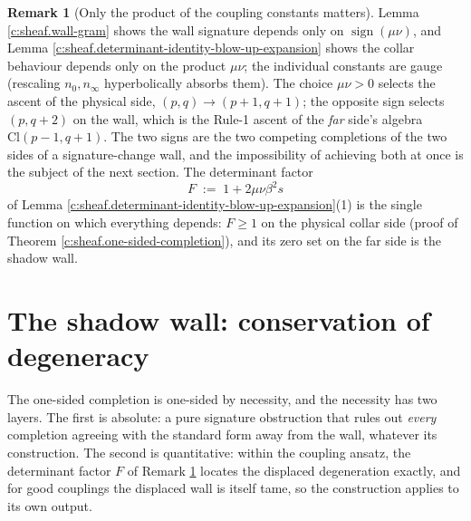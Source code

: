 \documentclass[11pt]{article}
\theoremstyle{definition}
\newtheorem{remark}[theorem]{Remark}
\theoremstyle{plain}
\providecommand{\Cl}{}\renewcommand{\Cl}{\mathrm{Cl}}
\providecommand{\nInf}{}\renewcommand{\nInf}{n_\infty}
\providecommand{\nO}{}\renewcommand{\nO}{n_0}
\begin{document}
\begin{remark}[Only the product of the coupling constants matters]\label{c:note.sheaf.only-product-coupling-constants-matters}
Lemma \ref{c:sheaf.wall-gram} shows the wall signature depends only on $\operatorname{sign}(\mu\nu)$, and Lemma \ref{c:sheaf.determinant-identity-blow-up-expansion} shows the collar behaviour depends only on the product $\mu\nu$; the individual constants are gauge (rescaling $\nO, \nInf$ hyperbolically absorbs them). The choice $\mu\nu > 0$ selects the ascent of the physical side, $(p,q) \to (p{+}1,q{+}1)$; the opposite sign selects $(p,q{+}2)$ on the wall, which is the Rule-1 ascent of the \emph{far} side's algebra $\Cl(p{-}1,q{+}1)$. The two signs are the two competing completions of the two sides of a signature-change wall, and the impossibility of achieving both at once is the subject of the next section. The determinant factor
\[
F \;:=\; 1 + 2\mu\nu\beta^2 s
\]
of Lemma \ref{c:sheaf.determinant-identity-blow-up-expansion}(1) is the single function on which everything depends: $F \geq 1$ on the physical collar side (proof of Theorem \ref{c:sheaf.one-sided-completion}), and its zero set on the far side is the shadow wall.
\end{remark}

\section{The shadow wall: conservation of degeneracy}

\label{c:note.sheaf.setting-shadow-wall-conservation-degeneracy}
The one-sided completion is one-sided by necessity, and the necessity has two layers. The first is absolute: a pure signature obstruction that rules out \emph{every} completion agreeing with the standard form away from the wall, whatever its construction. The second is quantitative: within the coupling ansatz, the determinant factor $F$ of Remark \ref{c:note.sheaf.only-product-coupling-constants-matters} locates the displaced degeneration exactly, and for good couplings the displaced wall is itself tame, so the construction applies to its own output.
\end{document}
